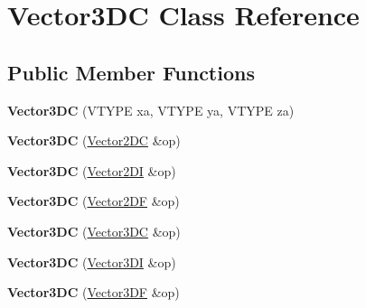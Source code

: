 \hypertarget{class_vector3_d_c}{\section{Vector3\+D\+C Class Reference}
\label{class_vector3_d_c}
}
\subsection*{Public Member Functions}
\begin{DoxyCompactItemize}
\item 
\hypertarget{class_vector3_d_c_add277d032479bc4c5cdbd66a1f0e44b1}{{\bfseries Vector3\+D\+C} (V\+T\+Y\+P\+E xa, V\+T\+Y\+P\+E ya, V\+T\+Y\+P\+E za)}\label{class_vector3_d_c_add277d032479bc4c5cdbd66a1f0e44b1}

\item 
\hypertarget{class_vector3_d_c_ade15a9a103e76d74dec942f2afd0932e}{{\bfseries Vector3\+D\+C} (\hyperlink{class_vector2_d_c}{Vector2\+D\+C} \&op)}\label{class_vector3_d_c_ade15a9a103e76d74dec942f2afd0932e}

\item 
\hypertarget{class_vector3_d_c_ad8353bd93beffa883a6207b401f491db}{{\bfseries Vector3\+D\+C} (\hyperlink{class_vector2_d_i}{Vector2\+D\+I} \&op)}\label{class_vector3_d_c_ad8353bd93beffa883a6207b401f491db}

\item 
\hypertarget{class_vector3_d_c_abc9c612645e3fc53e2f195738f61787b}{{\bfseries Vector3\+D\+C} (\hyperlink{class_vector2_d_f}{Vector2\+D\+F} \&op)}\label{class_vector3_d_c_abc9c612645e3fc53e2f195738f61787b}

\item 
\hypertarget{class_vector3_d_c_a408b48c2e9d34de2954ecfa1a9e054f4}{{\bfseries Vector3\+D\+C} (\hyperlink{class_vector3_d_c}{Vector3\+D\+C} \&op)}\label{class_vector3_d_c_a408b48c2e9d34de2954ecfa1a9e054f4}

\item 
\hypertarget{class_vector3_d_c_a809118c034ac906e6d3eb2babb496570}{{\bfseries Vector3\+D\+C} (\hyperlink{class_vector3_d_i}{Vector3\+D\+I} \&op)}\label{class_vector3_d_c_a809118c034ac906e6d3eb2babb496570}

\item 
\hypertarget{class_vector3_d_c_a616710335457c42b30b1d89f00265d39}{{\bfseries Vector3\+D\+C} (\hyperlink{class_vector3_d_f}{Vector3\+D\+F} \&op)}\label{class_vector3_d_c_a616710335457c42b30b1d89f00265d39}


\end{DoxyCompactItemize}
